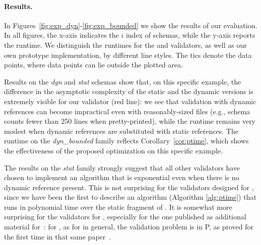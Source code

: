 \paragraph{Results.} 
In Figures~\ref{fig:exp_dyn}-\ref{fig:exp_bounded} we show the results of our evaluation. In all figures, the x-axis indicates the $i$ index of schemas, while the y-axis reports the runtime.
We distinguish the runtimes for the {\DFour} and {\DTwenty} validators, as well as our own prototype implementation, by different line styles.
The tics denote the data points, where data points can lie outside the plotted area.




Results on the \emph{dyn} and \emph{stat} schemas show
that, on this specific example, the difference in the asymptotic complexity of the static and the dynamic versions
is extremely visible for our validator (red line): we see that validation with dynamic references can
become impractical even with reasonably-sized  files (e.g., schema  counts fewer than 250 lines 
when pretty-printed), while the runtime remains very modest when dynamic references are substituted with static references.
The runtime on the \emph{dyn\_bounded} family reflects Corollary~\ref{cor:ptime}, which shows the effectiveness of the
proposed optimization on this specific example.

The results on the \emph{stat} family strongly suggest that all other validators have chosen to
implement an algorithm that is exponential even when there is no dynamic reference present.
This is not surprising for the validators designed for {\DTwenty}, since we have been the first to describe an algorithm
(Algorithm \ref{alg:ptime}) that runs in polynomial time over the static fragment of {\DTwenty}.
It is somewhat more surprising for the validators for {\DFour}, especially for the one
published as additional material for~\citep{DBLP:conf/www/PezoaRSUV16}: 
for {\DFour}, as for {\cJS} in general, the validation problem is in P, as proved
for the first time in that same paper~\citep{DBLP:conf/www/PezoaRSUV16}.



